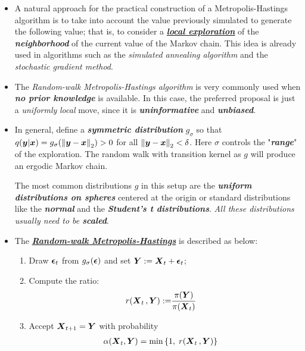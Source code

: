 \documentclass[11pt]{article}
\begin{document}
\begin{itemize}
\item A natural approach for the practical construction of a Metropolis-Hastings algorithm is to take into account the value previously simulated to generate the following value; that is, to consider a \underline{\emph{\textbf{local exploration}}} of the \emph{\textbf{neighborhood}} of the current value of the Markov chain. This idea is already used in algorithms such as the \emph{simulated annealing algorithm} and the \emph{stochastic gradient method}.

\item The \emph{Random-walk Metropolis-Hastings algorithm} is very commonly used when \emph{\textbf{no prior knowledge}} is available. In this case, the preferred proposal is just a \emph{uniformly} \emph{local} move, since it is \emph{\textbf{uninformative}} and \emph{\textbf{unbiased}}.

\item In general, define a \emph{\textbf{symmetric distribution}} $g_{\sigma}$ so that $q(\boldsymbol{y}|\boldsymbol{x}) = g_{\sigma}(\left\|\boldsymbol{y} - \boldsymbol{x}\right\|_{2}) > 0$ for all $\left\|\boldsymbol{y} - \boldsymbol{x}\right\|_{2} < \delta$. Here $\sigma$ controls the "\emph{\textbf{range}}" of the exploration. The random walk with transition kernel as $g$ will produce an ergodic Markov chain. 

The most common distributions $g$ in this setup are the \emph{\textbf{uniform distributions on spheres}} centered at the origin or standard distributions like the \emph{\textbf{normal}} and the \emph{\textbf{Student's t distributions}}. \emph{All these distributions usually need to be \textbf{scaled}}.


\item The \underline{\emph{\textbf{Random-walk Metropolis-Hastings}}} is described as below:
\begin{enumerate}
\item Draw $\boldsymbol{\epsilon}_{t}$ from $g_{\sigma}(\boldsymbol{\epsilon})$ and set $\boldsymbol{Y} := \boldsymbol{X}_{t} + \boldsymbol{\epsilon}_{t}$;

\item Compute the ratio:
\begin{align}
r(\boldsymbol{X}_{t}\,, \boldsymbol{Y}):= &\frac{\pi(\boldsymbol{Y})}{\pi(\boldsymbol{X}_{t})} \label{eqn: rw_ratio}
\end{align}

\item Accept $\boldsymbol{X}_{t+1} = \boldsymbol{Y}$ with probability 
\begin{align*}
\alpha(\boldsymbol{X}_{t}, \boldsymbol{Y}) &= \min\left\{1,\;r(\boldsymbol{X}_{t}\,, \boldsymbol{Y})\right\}
\end{align*}


\end{enumerate}
\end{itemize}
\end{document}
